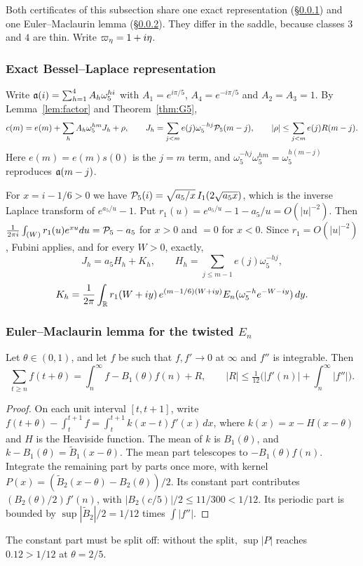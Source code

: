 Both certificates of this subsection share one exact representation (\S\ref{sec:t-repr}) and one Euler--Maclaurin lemma
(\S\ref{sec:t-em}). They differ in the saddle, because classes $3$ and $4$ are thin. Write $\varpi_\eta=1+i\eta$.

\subsubsection{Exact Bessel--Laplace representation}\label{sec:t-repr}
Write $\mathfrak a(i)=\sum_{h=1}^4A_h\omega_5^{hi}$ with $A_1=e^{i\pi/5}$, $A_4=e^{-i\pi/5}$ and $A_2=A_3=1$. By
Lemma~\ref{lem:factor} and Theorem~\ref{thm:G5},
\[
c(m)=e(m)+\sum_hA_h\omega_5^{hm}J_h+\rho,\qquad J_h=\sum_{j<m}e(j)\omega_5^{-hj}\mathcal P_5(m-j),\qquad|\rho|\le\sum_{j<m}e(j)R(m-j).
\]
Here $e(m)=e(m)s(0)$ is the $j=m$ term, and $\omega_5^{-hj}\omega_5^{hm}=\omega_5^{h(m-j)}$ reproduces $\mathfrak a(m-j)$.

For $x=i-1/6>0$ we have $\mathcal P_5(i)=\sqrt{a_5/x}\,I_1(2\sqrt{a_5x})$, which is the inverse Laplace transform of
$e^{a_5/u}-1$. Put $r_1(u)=e^{a_5/u}-1-a_5/u=O(|u|^{-2})$. Then
$\frac1{2\pi i}\int_{(W)}r_1(u)e^{xu}du=\mathcal P_5-a_5$ for $x>0$ and $=0$ for $x<0$. Since $r_1=O(|u|^{-2})$, Fubini applies,
and for every $W>0$, exactly,
\[
J_h=a_5H_h+K_h,\qquad H_h=\sum_{j\le m-1}e(j)\omega_5^{-hj},
\]
\[
K_h=\frac1{2\pi}\int_{\mathbb R}r_1(W+iy)\,e^{(m-1/6)(W+iy)}E_n(\omega_5^{-h}e^{-W-iy})\,dy.
\]

\subsubsection{Euler--Maclaurin lemma for the twisted \texorpdfstring{$E_n$}{En}}\label{sec:t-em}

\begin{lemma}\label{lem:t-em}
Let $\theta\in(0,1)$, and let $f$ be such that $f,f'\to0$ at $\infty$ and $f''$ is integrable. Then
\[
\sum_{t\ge n}f(t+\theta)=\int_n^\infty f-B_1(\theta)f(n)+R,\qquad|R|\le\tfrac1{12}\Big(|f'(n)|+\int_n^\infty|f''|\Big).
\]
\end{lemma}
\begin{proof}
On each unit interval $[t,t+1]$, write $f(t+\theta)-\int_t^{t+1}f=\int_t^{t+1}k(x-t)f'(x)\,dx$, where $k(x)=x-H(x-\theta)$
and $H$ is the Heaviside function. The mean of $k$ is $B_1(\theta)$, and $k-B_1(\theta)=\tilde B_1(x-\theta)$. The mean
part telescopes to $-B_1(\theta)f(n)$. Integrate the remaining part by parts once more, with kernel
$P(x)=(\tilde B_2(x-\theta)-B_2(\theta))/2$. Its constant part contributes $(B_2(\theta)/2)f'(n)$, with
$|B_2(c/5)|/2\le 11/300<1/12$. Its periodic part is bounded by $\sup|\tilde B_2|/2=1/12$ times $\int|f''|$.
\end{proof}
The constant part must be split off: without the split, $\sup|P|$ reaches $0.12>1/12$ at $\theta=2/5$.

